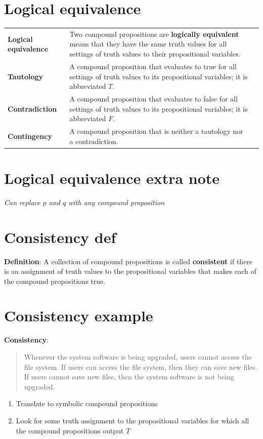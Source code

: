 \documentclass[12pt, oneside]{article}
\begin{document}
\section*{Logical equivalence}


\begin{tabular}{lp{4in}p{2in}}
{\bf Logical equivalence } &Two compound  propositions are {\bf logically  equivalent} means that  they 
have the  same  truth  values for all settings of truth  values to their propositional  variables.\\
{\bf Tautology} & A compound proposition that evaluates to true
for all settings of truth  values to its propositional  variables; it is  abbreviated $T$.\\
{\bf Contradiction} & A compound proposition that  evaluates  to  false 
for  all settings of truth  values to its propositional  variables; it  is abbreviated $F$.\\
{\bf Contingency} & A compound proposition that is neither a tautology nor a contradiction.\\
\end{tabular}
 \vfill
\section*{Logical equivalence extra note}


{\it Can replace $p$ and $q$ with any compound proposition}
 \vfill
\section*{Consistency def}


{\bf Definition}: A collection of  compound  propositions
is called {\bf consistent} if  there
is  an assignment  of  truth values
to  the  propositional variables that makes
each of the compound propositions  true.
 \vfill
\section*{Consistency example}


{\bf Consistency}: 
\begin{quote}
Whenever the system software is being upgraded, users cannot access the file system. 
If users can access the file system, then they can save new files. 
If users cannot save new files, then the system software is not being upgraded.
\end{quote}

\begin{enumerate}
\item Translate to symbolic compound propositions
\vfill
\item Look for some truth assignment to the propositional variables for which all the compound propositions output $T$
\vfill
\end{enumerate} \vfill
\end{document}
